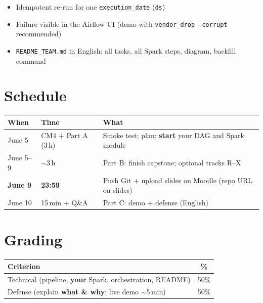 \documentclass[11pt,a4paper]{article}
\begin{document}
\begin{itemize}[nosep]
  \item Idempotent re-run for one \texttt{execution\_date} (\texttt{ds})
  \item Failure visible in the Airflow UI (demo with \texttt{vendor\_drop --corrupt} recommended)
  \item \texttt{README\_TEAM.md} in English: all tasks, all Spark steps, diagram, backfill command
\end{itemize}

\section*{Schedule}
\label{sec:schedule}

\begin{center}
\begin{tabular}{@{} l l p{7.5cm} @{}}
\toprule
\textbf{When} & \textbf{Time} & \textbf{What} \\
\midrule
June 5 & CM4 + Part A (3\,h) & Smoke test; plan; \textbf{start} your DAG and Spark module \\
June 5--9 & $\sim$3\,h & Part B: finish capstone; optional tracks R--X \\
\textbf{June 9} & \textbf{23:59} & Push Git + upload slides on Moodle (repo URL on slides) \\
June 10 & 15\,min + Q\&A & Part C: demo + defense (English) \\
\bottomrule
\end{tabular}
\end{center}

\section*{Grading}
\label{sec:grading}

\begin{center}
\renewcommand{\arraystretch}{1.25}
\begin{tabular}{@{} p{10cm} c @{}}
\toprule
\textbf{Criterion} & \textbf{\%} \\
\midrule
Technical (pipeline, \textbf{your} Spark, orchestration, README) & 50\% \\
Defense (explain \textbf{what \& why}; live demo $\sim$5\,min) & 50\% \\
\bottomrule
\end{tabular}
\end{center}
\end{document}
